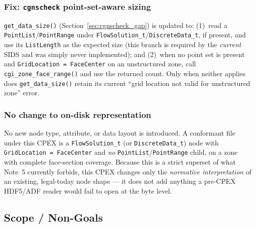 \documentclass[11pt,letterpaper]{article}
\begin{document}
\subsubsection{Fix: \texttt{cgnscheck} point-set-aware sizing}

\texttt{get\_data\_size()} (Section~\ref{sec:cgnscheck_gap}) is updated
to: (1)~read a \texttt{PointList}/\texttt{PointRange} under
\texttt{FlowSolution\_t}/\texttt{DiscreteData\_t}, if present, and use its
\texttt{ListLength} as the expected size (this branch is required by the
\emph{current} SIDS and was simply never implemented); and (2)~when no
point set is present and \texttt{GridLocation~=~FaceCenter} on an
unstructured zone, call \texttt{cgi\_zone\_face\_range()} and use
the returned count. Only when neither applies does
\texttt{get\_data\_size()} retain its current ``grid location not valid
for unstructured zone'' error.

\subsubsection{No change to on-disk representation}

No new node type, attribute, or data layout is introduced. A conformant
file under this CPEX is a \texttt{FlowSolution\_t} (or
\texttt{DiscreteData\_t}) node with \texttt{GridLocation~=~FaceCenter}
and \emph{no} \texttt{PointList}/\texttt{PointRange} child, on a zone with
complete face-section coverage. Because this is a strict superset of what
Note~5 currently forbids, this CPEX changes only the \emph{normative
interpretation} of an existing, legal-today node shape --- it does not
add anything a pre-CPEX HDF5/ADF reader would fail to open at the
byte level.

\subsection{Scope / Non-Goals}
\label{sec:scope-nongoals}
\end{document}
